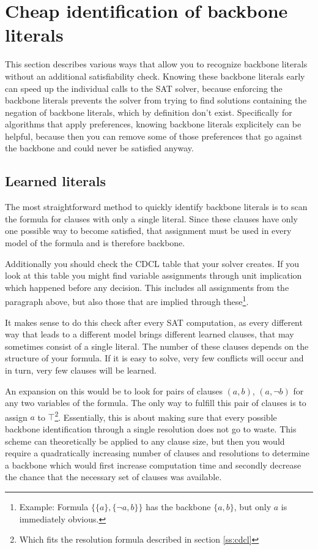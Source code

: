 \section{Cheap identification of backbone literals}
\label{sec:cheapbb}
This section describes various ways that allow you to recognize backbone literals without an additional satisfiability check. Knowing these backbone literals early can speed up the individual calls to the SAT solver, because enforcing the backbone literals prevents the solver from trying to find solutions containing the negation of backbone literals, which by definition don't exist. Specifically for algorithms that apply preferences, knowing backbone literals explicitely can be helpful, because then you can remove some of those preferences that go against the backbone and could never be satisfied anyway.



\subsection{Learned literals}
\label{subsec:axiomatic}
The most straightforward method to quickly identify backbone literals is to scan the formula for clauses with only a single literal. Since these clauses have only one possible way to become satisfied, that assignment must be used in every model of the formula and is therefore backbone.

Additionally you should check the CDCL table that your solver creates. If you look at this table you might find variable assignments through unit implication which happened before any decision. This includes all assignments from the paragraph above, but also those that are implied through these\footnote{Example: Formula $\{\{a\},\{\neg a, b\}\}$ has the backbone $\{a,b\}$, but only $a$ is immediately obvious.}.

It makes sense to do this check after every SAT computation, as every different way that leads to a different model brings different learned clauses, that may sometimes consist of a single literal. The number of these clauses depends on the structure of your formula. If it is easy to solve, very few conflicts will occur and in turn, very few clauses will be learned.

An expansion on this would be to look for pairs of clauses $(a,b)$, $(a,\neg b)$ for any two variables of the formula. The only way to fulfill this pair of clauses is to assign $a$ to $\top$\footnote{Which fits the resolution formula described in 
section \ref{ss:cdcl}}. Essentially, this is about making sure that every possible backbone identification through a single resolution does not go to waste. This scheme can theoretically be applied to any clause size, but then you would require a quadratically increasing number of clauses and resolutions to determine a backbone which would first increase computation time and secondly decrease the chance that the necessary set of clauses was available.

